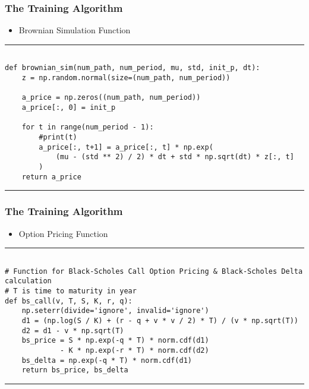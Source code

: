 \documentclass[11pt]{beamer}
\begin{document}
\begin{frame}[fragile]
\frametitle{The Training Algorithm}
\scriptsize
	\begin{itemize}
		\item Brownian Simulation Function
	\end{itemize}

\rule{\textwidth}{1pt}
\begin{verbatim}

def brownian_sim(num_path, num_period, mu, std, init_p, dt):
    z = np.random.normal(size=(num_path, num_period))

    a_price = np.zeros((num_path, num_period))
    a_price[:, 0] = init_p

    for t in range(num_period - 1):
        #print(t)
        a_price[:, t+1] = a_price[:, t] * np.exp(
            (mu - (std ** 2) / 2) * dt + std * np.sqrt(dt) * z[:, t]
        )
    return a_price

\end{verbatim}
\rule{\textwidth}{1pt}
\end{frame}
\begin{frame}[fragile]
\frametitle{The Training Algorithm}
\scriptsize
	\begin{itemize}
		\item Option Pricing Function
	\end{itemize}

\rule{\textwidth}{1pt}
\begin{verbatim}

# Function for Black-Scholes Call Option Pricing & Black-Scholes Delta calculation
# T is time to maturity in year
def bs_call(v, T, S, K, r, q):
    np.seterr(divide='ignore', invalid='ignore')
    d1 = (np.log(S / K) + (r - q + v * v / 2) * T) / (v * np.sqrt(T))
    d2 = d1 - v * np.sqrt(T)
    bs_price = S * np.exp(-q * T) * norm.cdf(d1) 
             - K * np.exp(-r * T) * norm.cdf(d2)
    bs_delta = np.exp(-q * T) * norm.cdf(d1)
    return bs_price, bs_delta

\end{verbatim}
\rule{\textwidth}{1pt}
\end{frame}
\end{document}
